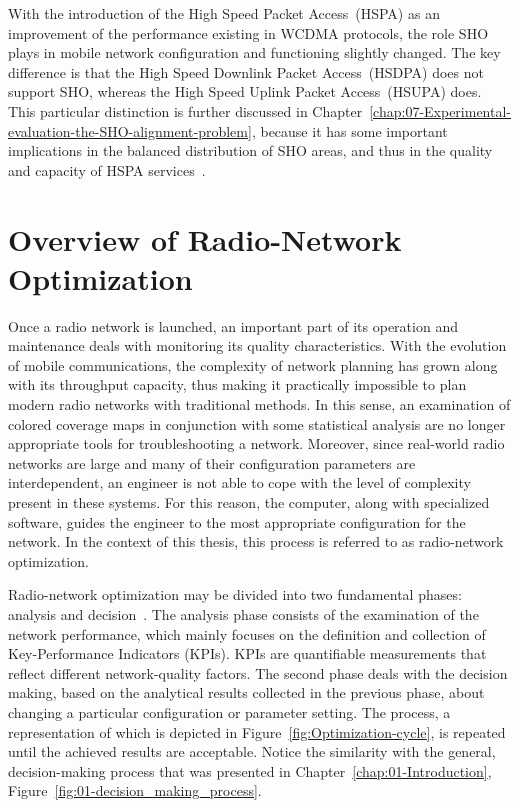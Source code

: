 With the introduction of the High Speed Packet Access~(HSPA)
as an improvement of the performance existing in WCDMA protocols,
the role SHO plays in mobile network configuration and functioning
slightly changed. The key difference is that the High Speed Downlink
Packet Access~(HSDPA)
does not support SHO, whereas the High Speed Uplink Packet Access~(HSUPA)
does. This particular distinction is further discussed in Chapter~\ref{chap:07-Experimental-evaluation-the-SHO-alignment-problem},
because it has some important implications in the balanced distribution
of SHO areas, and thus in the quality and capacity of HSPA services~\cite{holma2006hsdpa}.


\chapter{Overview of Radio-Network Optimization \label{chap:02-Optimization_of_radio_networks}}

Once a radio network is launched, an important part of its operation
and maintenance deals with monitoring its quality characteristics.
With the evolution of mobile communications, the complexity of network
planning has grown along with its throughput capacity, thus making
it practically impossible to plan modern radio networks with traditional
methods. In this sense, an examination of colored coverage maps in
conjunction with some statistical analysis are no longer appropriate
tools for troubleshooting a network. Moreover, since real-world radio
networks are large and many of their configuration parameters are
interdependent, an engineer is not able to cope with the level of
complexity present in these systems. For this reason, the computer,
along with specialized software, guides the engineer to the most appropriate
configuration for the network. In the context of this thesis, this
process is referred to as radio-network optimization.

Radio-network optimization may be divided into two fundamental phases:
analysis and decision~\cite{Nawrocki-Understanding_UMTS_radio_network_modelling_and_optimisation:2006}.
The analysis phase consists of the examination of the network performance,
which mainly focuses on the definition and collection of Key-Performance
Indicators (KPIs).
KPIs are quantifiable measurements that reflect different network-quality
factors. The second phase deals with the decision making, based on
the analytical results collected in the previous phase, about changing
a particular configuration or parameter setting. The process, a representation
of which is depicted in Figure~\ref{fig:Optimization-cycle}, is
repeated until the achieved results are acceptable. Notice the similarity
with the general, decision-making process that was presented in Chapter~\ref{chap:01-Introduction},
Figure~\ref{fig:01-decision_making_process}.

